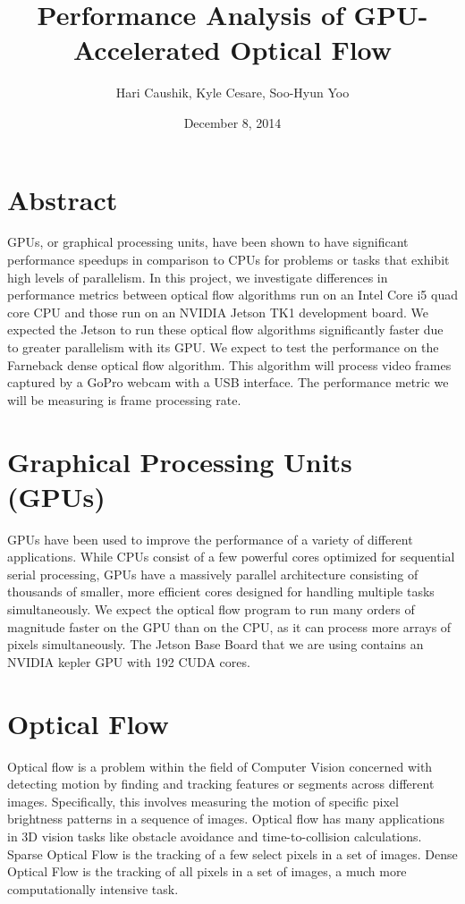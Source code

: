 \documentclass{article}
\title{Performance Analysis of GPU-Accelerated Optical Flow}
\date{December 8, 2014}
\author{Hari Caushik, Kyle Cesare, Soo-Hyun Yoo}
\begin{document}
\maketitle

\newpage

\tableofcontents

\newpage

\section{Abstract}
GPUs, or graphical processing units, have been shown to have significant
performance speedups in comparison to CPUs for problems or tasks that exhibit
high levels of parallelism. In this project, we investigate differences in
performance metrics between optical flow algorithms run on an Intel Core i5 quad
core CPU and those run on an NVIDIA Jetson TK1 development board. We expected 
the Jetson to run these optical flow algorithms significantly faster due to 
greater parallelism with its GPU. We expect to test the performance on the 
Farneback dense optical flow algorithm. This algorithm will process video frames
captured by a GoPro webcam with a USB interface. The performance metric we will
be measuring is frame processing rate.

\section{Graphical Processing Units (GPUs)}
GPUs have been used to improve the performance of a variety of different 
applications. While CPUs consist of a few powerful cores optimized for 
sequential serial processing, GPUs have a massively parallel architecture 
consisting of thousands of smaller, more efficient cores designed for handling
multiple tasks simultaneously. We expect the optical flow program to run many
orders of magnitude faster on the GPU than on the CPU, as it can process more 
arrays of pixels simultaneously. The Jetson Base Board that we are using 
contains an NVIDIA kepler GPU with 192 CUDA cores.

\section{Optical Flow}
Optical flow is a problem within the field of Computer Vision concerned with 
detecting motion by finding and tracking features or segments across different 
images. Specifically, this involves measuring the motion of specific pixel 
brightness patterns in a sequence of images. Optical flow has many applications
in 3D vision tasks like obstacle avoidance and time-to-collision calculations.
Sparse Optical Flow is the tracking of a few select pixels in a set of images.
Dense Optical Flow is the tracking of all pixels in a set of images, a much more
computationally intensive task.
\end{document}
